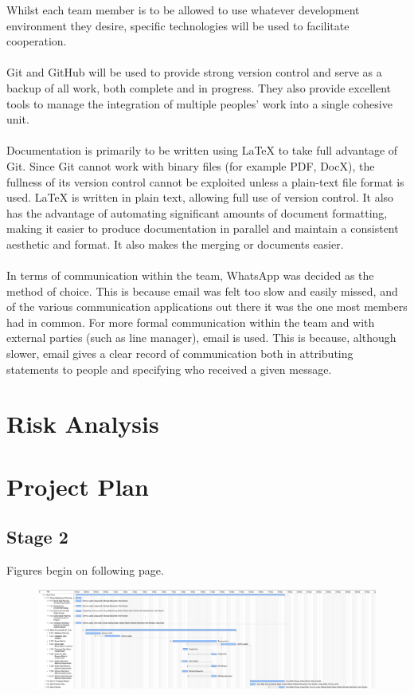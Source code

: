 \documentclass[11pt, a4paper]{report}
\begin{document}
Whilst each team member is to be allowed to use whatever development environment they desire, specific technologies will be used to facilitate cooperation.\\
\\
Git and GitHub will be used to provide strong version control and serve as a backup of all work, both complete and in progress. They also provide excellent tools to manage the integration of multiple peoples' work into a single cohesive unit.\\
\\
Documentation is primarily to be written using LaTeX to take full advantage of Git. Since Git cannot work with binary files (for example PDF, DocX), the fullness of its version control cannot be exploited unless a plain-text file format is used. LaTeX is written in plain text, allowing full use of version control. It also has the advantage of automating significant amounts of document formatting, making it easier to produce documentation in parallel and maintain a consistent aesthetic and format. It also makes the merging or documents easier.\\
\\
In terms of communication within the team, WhatsApp was decided as the method of choice. This is because email was felt too slow and easily missed, and of the various communication applications out there it was the one most members had in common. For more formal communication within the team and with external parties (such as line manager), email is used. This is because, although slower, email gives a clear record of communication both in attributing statements to people and specifying who received a given message.
\section{Risk Analysis}

\section{Project Plan}

\subsection{Stage 2}

Figures begin on following page.

\begin{figure}
\centering
\includegraphics[scale=0.25]{Figures/Plan2-1.png}
\end{figure}
\end{document}
